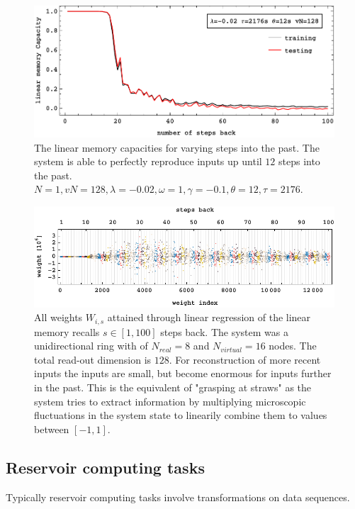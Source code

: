 \begin{figure}
	\centering
	\includegraphics[width=0.99\linewidth]{pics/linearMemoryCurveN1}
	\caption{The linear memory capacities for varying steps into the past. The system is able to perfectly reproduce inputs up until $12$ steps into the past. $N=1, vN=128, \lambda=-0.02, \omega=1, \gamma=-0.1, \theta=12, \tau=2176$. }
	\label{fig:linearMemoryRecallCurveN1}
\end{figure}

\begin{figure}
	\centering
	\includegraphics[width=0.99\linewidth]{pics/weight_plot}
	\caption{All weights $W_{i,s}$ attained through linear regression of the linear memory recalls $s \in [1,100]$ steps back. The system was a unidirectional ring with of $N_{real}=8$ and $N_{virtual}=16$ nodes. The total read-out dimension is $128$. For reconstruction of more recent inputs the inputs are small, but become enormous for inputs further in the past. This is the equivalent of "grasping at straws" as the system tries to extract information by multiplying microscopic fluctuations in the system state to linearily combine them to values between $[-1,1]$.}
	\label{fig:linearMemoryRecallWeights}
\end{figure}


\subsection{Reservoir computing tasks}

Typically reservoir computing tasks involve transformations on data sequences.

